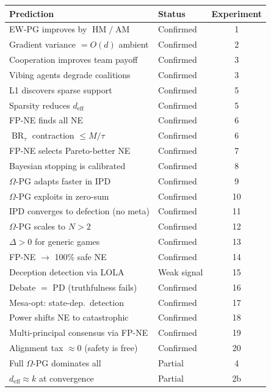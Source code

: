 \documentclass[11pt,a4paper]{article}
\DeclareMathOperator{\AM}{AM}
\DeclareMathOperator{\HM}{HM}
\DeclareMathOperator{\BR}{BR}
\begin{document}
\begin{center}
\begin{tabular}{llc}
\toprule
\textbf{Prediction} & \textbf{Status} & \textbf{Experiment} \\
\midrule
EW-PG improves by $\HM/\AM$ & \textcolor{cGreen}{Confirmed} & 1 \\
Gradient variance $= O(d)$ ambient & \textcolor{cGreen}{Confirmed} & 2 \\
Cooperation improves team payoff & \textcolor{cGreen}{Confirmed} & 3 \\
Vibing agents degrade coalitions & \textcolor{cGreen}{Confirmed} & 3 \\
L1 discovers sparse support & \textcolor{cGreen}{Confirmed} & 5 \\
Sparsity reduces $d_{\text{eff}}$ & \textcolor{cGreen}{Confirmed} & 5 \\
FP-NE finds all NE & \textcolor{cGreen}{Confirmed} & 6 \\
$\BR_\tau$ contraction $\leq M/\tau$ & \textcolor{cGreen}{Confirmed} & 6 \\
FP-NE selects Pareto-better NE & \textcolor{cGreen}{Confirmed} & 7 \\
Bayesian stopping is calibrated & \textcolor{cGreen}{Confirmed} & 8 \\
$\Omega$-PG adapts faster in IPD & \textcolor{cGreen}{Confirmed} & 9 \\
$\Omega$-PG exploits in zero-sum & \textcolor{cGreen}{Confirmed} & 10 \\
IPD converges to defection (no meta) & \textcolor{cGreen}{Confirmed} & 11 \\
$\Omega$-PG scales to $N > 2$ & \textcolor{cGreen}{Confirmed} & 12 \\
$\Delta > 0$ for generic games & \textcolor{cGreen}{Confirmed} & 13 \\
FP-NE $\to$ 100\% safe NE & \textcolor{cGreen}{Confirmed} & 14 \\
Deception detection via LOLA & \textcolor{cOrange}{Weak signal} & 15 \\
Debate $=$ PD (truthfulness fails) & \textcolor{cGreen}{Confirmed} & 16 \\
Mesa-opt: state-dep.\ detection & \textcolor{cGreen}{Confirmed} & 17 \\
Power shifts NE to catastrophic & \textcolor{cGreen}{Confirmed} & 18 \\
Multi-principal consensus via FP-NE & \textcolor{cGreen}{Confirmed} & 19 \\
Alignment tax $\approx 0$ (safety is free) & \textcolor{cGreen}{Confirmed} & 20 \\
Full $\Omega$-PG dominates all & \textcolor{cOrange}{Partial} & 4 \\
$d_{\text{eff}} \approx k$ at convergence & \textcolor{cOrange}{Partial} & 2b \\
\bottomrule
\end{tabular}
\end{center}
\end{document}
